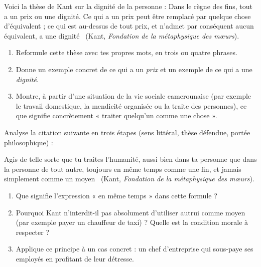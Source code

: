 \documentclass[11pt]{article}
\newcounter{popsec}
\newcounter{popsub}
\newcommand{\courssub}[1]{%
  \stepcounter{popsub}%
  \par\vspace{9pt}\noindent{\popxbold\fontsize{11.5}{13}\selectfont\color{popink}{\color{poporange}\thepopsec.\thepopsub}\hspace{6pt}#1}\par\nopagebreak\vspace{4pt}
}
\begin{document}
\courssub{Je m'entraîne}

\begin{exercice}
Voici la thèse de Kant sur la dignité de la personne : \guillemotleft Dans le règne des fins, tout a un prix ou une dignité. Ce qui a un prix peut être remplacé par quelque chose d'équivalent ; ce qui est au-dessus de tout prix, et n'admet par conséquent aucun équivalent, a une dignité \guillemotright\ (Kant, \emph{Fondation de la métaphysique des mœurs}).
\begin{enumerate}
\item Reformule cette thèse avec tes propres mots, en trois ou quatre phrases.
\item Donne un exemple concret de ce qui a un \emph{prix} et un exemple de ce qui a une \emph{dignité}.
\item Montre, à partir d'une situation de la vie sociale camerounaise (par exemple le travail domestique, la mendicité organisée ou la traite des personnes), ce que signifie concrètement « traiter quelqu'un comme une chose ».
\end{enumerate}
\end{exercice}

\begin{exercice}
Analyse la citation suivante en trois étapes (sens littéral, thèse défendue, portée philosophique) :
\begin{center}
\guillemotleft Agis de telle sorte que tu traites l'humanité, aussi bien dans ta personne que dans la personne de tout autre, toujours en même temps comme une fin, et jamais simplement comme un moyen \guillemotright\ (Kant, \emph{Fondation de la métaphysique des mœurs}).
\end{center}
\begin{enumerate}
\item Que signifie l'expression « en même temps » dans cette formule ?
\item Pourquoi Kant n'interdit-il pas absolument d'utiliser autrui comme moyen (par exemple payer un chauffeur de taxi) ? Quelle est la condition morale à respecter ?
\item Applique ce principe à un cas concret : un chef d'entreprise qui sous-paye ses employés en profitant de leur détresse.
\end{enumerate}
\end{exercice}
\end{document}
